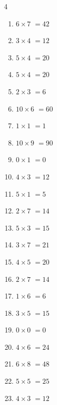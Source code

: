 \begin{multicols}{4}
\begin{enumerate}
  \item $6\times 7$
        $=42$

  \item $3\times 4$
        $=12$

  \item $5\times 4$
        $=20$

  \item $5\times 4$
        $=20$

  \item $2\times 3$
        $=6$

  \item $10\times 6$
        $=60$

  \item $1\times 1$
        $=1$

\columnbreak %

  \item $10\times 9$
        $=90$

  \item $0\times 1$
        $=0$

  \item $4\times 3$
        $=12$

  \item $5\times 1$
        $=5$

  \item $2\times 7$
        $=14$

  \item $5\times 3$
        $=15$

  \item $3\times 7$
        $=21$

  \item $4\times 5$
        $=20$

  \item $2\times 7$
        $=14$

  \item $1\times 6$
        $=6$

  \item $3\times 5$
        $=15$

  \item $0\times 0$
        $=0$

  \item $4\times 6$
        $=24$

  \item $6\times 8$
        $=48$

  \item $5\times 5$
        $=25$

  \item $4\times 3$
        $=12$


\end{enumerate}
\end{multicols}
